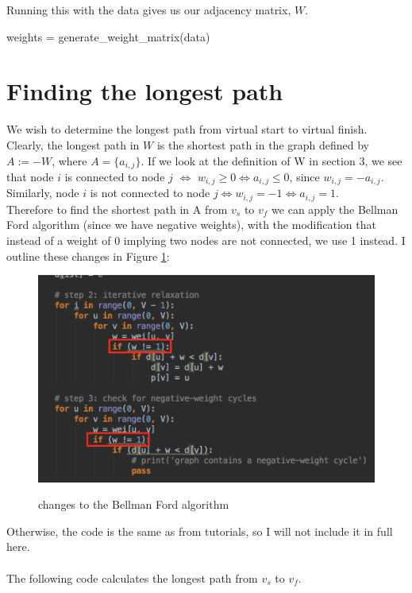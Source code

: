 \documentclass[paper=a4, fontsize=12pt]{scrartcl} %
\numberwithin{equation}{section}       %
\numberwithin{figure}{section}         %
\numberwithin{table}{section}          %
\begin{document}
Running this with the data gives us our adjacency matrix, $W$.

\begin{python}
weights = generate_weight_matrix(data)
\end{python}

\section{Finding the longest path}

We wish to determine the longest path from virtual start to virtual finish. Clearly, the longest path in $W$ is the shortest path in the graph defined by $A:=-W$, where $A = \{a_{i,j} \}$. If we look at the definition of W in section 3, we see that node $i$ is connected to node $j$ $\iff$ $w_{i,j} \geq 0 \iff a_{i,j} \leq 0$, since $w_{i,j} = -a_{i,j}$. Similarly, node $i$ is not connected to node $j \iff w_{i,j} = -1 \iff a_{i,j} = 1$. \\
Therefore to find the shortest path in A from $v_{s}$ to $v_{f}$ we can apply the Bellman Ford algorithm (since we have negative weights), with the modification that instead of a weight of 0 implying two nodes are not connected, we use 1 instead. I outline these changes in Figure \ref{changes}:

\begin{figure}[h]
\caption{changes to the Bellman Ford algorithm}
\centering
\includegraphics{changes}\label{changes}
\end{figure}

Otherwise, the code is the same as from tutorials, so I will not include it in full here.\\ \\
The following code calculates the longest path from $v_{s}$ to $v_{f}$.
\end{document}
